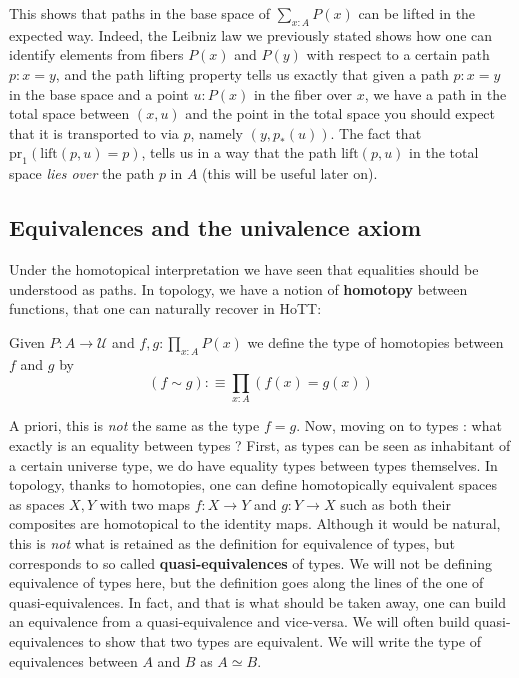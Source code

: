 \documentclass{report}
\begin{document}
This shows that paths in the base space of $\sum_{x : A} P(x)$ can be lifted in the expected way. Indeed, the Leibniz law we previously stated shows how one can identify elements from fibers $P(x)$ and $P(y)$ with respect to a certain path $p : x=y$, and the path lifting property tells us exactly that given a path $p: x = y$ in the base space and a point $u : P(x)$ in the fiber over $x$, we have a path in the total space between $(x,u)$ and the point in the total space you should expect that it is transported to via $p$, namely $(y,p_*(u))$. The fact that $\mathrm{pr}_1(\mathrm{lift}(p,u)=p)$, tells us in a way that the path $\mathrm{lift}(p,u)$ in the total space \textit{lies over} the path $p$ in $A$ (this will be useful later on).
\subsection{Equivalences and the univalence axiom}
Under the homotopical interpretation we have seen that equalities should be understood as paths. In topology, we have a notion of \textbf{homotopy} between functions, that one can naturally recover in HoTT:
\begin{mydef}[Homotopy]
  Given $P : A \rightarrow \mathcal{U}$ and $ f,g : \prod_{x : A} P(x)$ we define the type of homotopies between $f$ and $g$ by
  $$(f \sim g) :\equiv \prod_{x : A} (f(x)=g(x))$$
\end{mydef}
A priori, this is \textit{not} the same as the type $f =g$. Now, moving on to types : what exactly is an equality between types ? First, as types can be seen as inhabitant of a certain universe type, we do have equality types between types themselves.
In topology, thanks to homotopies, one can define homotopically equivalent spaces as spaces $X,Y$ with two maps $f : X \rightarrow Y$ and $g : Y \rightarrow X$ such as both their composites are homotopical to the identity maps. Although it would be natural, this is \textit{not} what is retained as the definition for equivalence of types, but corresponds to so called \textbf{quasi-equivalences} of types. We will not be defining equivalence of types here, but the definition goes along the lines of the one of quasi-equivalences. In fact, and that is what should be taken away, one can build an equivalence from a quasi-equivalence and vice-versa. We will often build quasi-equivalences to show that two types are equivalent. We will write the type of equivalences between $A$ and $B$ as $A \simeq B$.
\end{document}
